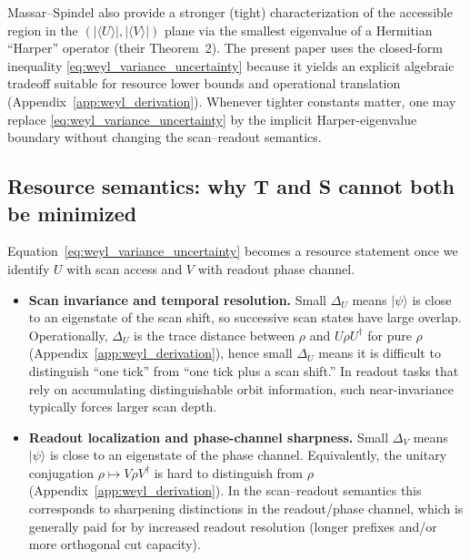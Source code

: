 \begin{remark}
Massar--Spindel \cite{MassarSpindel2008} also provide a stronger (tight) characterization of the accessible region in the $(|\langle U\rangle|,|\langle V\rangle|)$ plane via the smallest eigenvalue of a Hermitian ``Harper'' operator (their Theorem~2).
The present paper uses the closed-form inequality \eqref{eq:weyl_variance_uncertainty} because it yields an explicit algebraic tradeoff suitable for resource lower bounds and operational translation (Appendix~\ref{app:weyl_derivation}).
Whenever tighter constants matter, one may replace \eqref{eq:weyl_variance_uncertainty} by the implicit Harper-eigenvalue boundary without changing the scan--readout semantics.
\end{remark}

\subsection{Resource semantics: why T and S cannot both be minimized}
Equation~\eqref{eq:weyl_variance_uncertainty} becomes a resource statement once we identify $U$ with scan access and $V$ with readout phase channel.

\begin{itemize}
    \item \textbf{Scan invariance and temporal resolution.} Small $\Delta_U$ means $|\psi\rangle$ is close to an eigenstate of the scan shift, so successive scan states have large overlap. Operationally, $\Delta_U$ is the trace distance between $\rho$ and $U\rho U^{\dagger}$ for pure $\rho$ (Appendix~\ref{app:weyl_derivation}), hence small $\Delta_U$ means it is difficult to distinguish ``one tick'' from ``one tick plus a scan shift.'' In readout tasks that rely on accumulating distinguishable orbit information, such near-invariance typically forces larger scan depth.
    \item \textbf{Readout localization and phase-channel sharpness.} Small $\Delta_V$ means $|\psi\rangle$ is close to an eigenstate of the phase channel. Equivalently, the unitary conjugation $\rho\mapsto V\rho V^{\dagger}$ is hard to distinguish from $\rho$ (Appendix~\ref{app:weyl_derivation}). In the scan--readout semantics this corresponds to sharpening distinctions in the readout/phase channel, which is generally paid for by increased readout resolution (longer prefixes and/or more orthogonal cut capacity).
\end{itemize}

